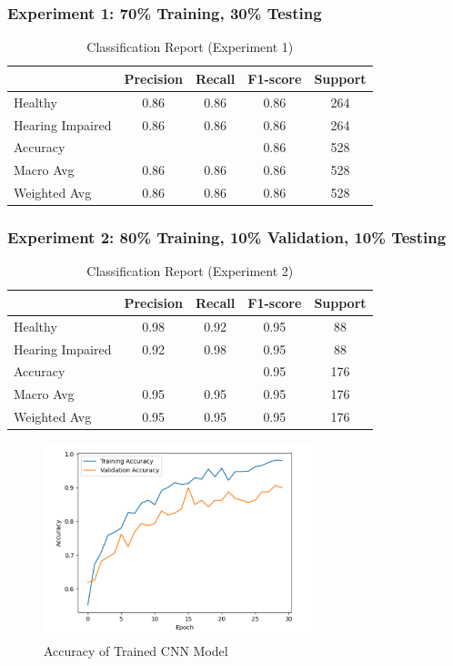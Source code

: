 \documentclass{article}
\begin{document}
\subsubsection{Experiment 1: 70\% Training, 30\% Testing}
\begin{table}[ht]
  \centering
  \caption{Classification Report (Experiment 1)}
  \label{tab:classification_report_1}
  \begin{tabular}{lcccc}
    \hline
    & Precision & Recall & F1-score & Support \\
    \hline
    Healthy & 0.86 & 0.86 & 0.86 & 264 \\
    Hearing Impaired & 0.86 & 0.86 & 0.86 & 264 \\
    \hline
    Accuracy & & & 0.86 & 528 \\
    Macro Avg & 0.86 & 0.86 & 0.86 & 528 \\
    Weighted Avg & 0.86 & 0.86 & 0.86 & 528 \\
    \hline
  \end{tabular}
\end{table}

\subsubsection{Experiment 2: 80\% Training, 10\% Validation, 10\% Testing}
\begin{table}[ht]
  \centering
  \caption{Classification Report (Experiment 2)}
  \label{tab:classification_report_2}
  \begin{tabular}{lcccc}
    \hline
    & Precision & Recall & F1-score & Support \\
    \hline
    Healthy & 0.98 & 0.92 & 0.95 & 88 \\
    Hearing Impaired & 0.92 & 0.98 & 0.95 & 88 \\
    \hline
    Accuracy & & & 0.95 & 176 \\
    Macro Avg & 0.95 & 0.95 & 0.95 & 176 \\
    Weighted Avg & 0.95 & 0.95 & 0.95 & 176 \\
    \hline
  \end{tabular}
\end{table}

\begin{figure}[H]
  \centering
  \includegraphics[width=0.7\textwidth]{801010.png} %
  \caption{Accuracy of Trained CNN Model}
  \label{fig:accuracy_cnn}
\end{figure}
\end{document}

